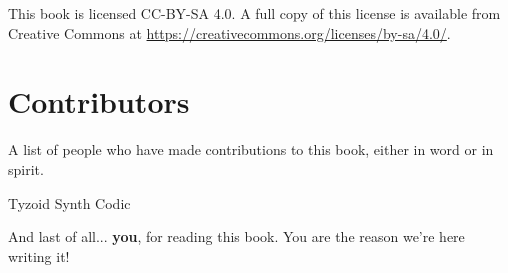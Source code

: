 \documentclass[../main.tex]{subfiles}
\begin{document}
\vfill
This book is licensed CC-BY-SA 4.0. A full copy of this license is available
from Creative Commons at \url{https://creativecommons.org/licenses/by-sa/4.0/}.


\newpage
\section*{Contributors}
A list of people who have made contributions to this book, either in word
or in spirit.

\vspace{2cm}

\begin{center}
Tyzoid \csp
Synth \csp
Codic \csp
\end{center}

\vfill
And last of all... \textbf{you}, for reading this book. You are the reason we're
here writing it!
\end{document}
